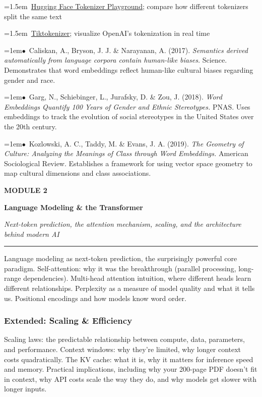 \documentclass[11pt, a4paper]{article}
\newcommand{\modulehead}[3]{%
  \vspace{0.5em}
  {\small\sffamily\bfseries\textcolor{accent}{MODULE #1}}\par\vspace{-0.3em}
  {\Large\sffamily\bfseries\textcolor{dark}{#2}}\par\vspace{-0.2em}
  {\small\textit{\textcolor{muted}{#3}}}\par
  \vspace{0.2em}\textcolor{bordercol}{\rule{\textwidth}{0.3pt}}\par
}
\newcommand{\seclabel}[1]{%
  \vspace{0.6em}{\normalsize\sffamily\bfseries\textcolor{accent}{#1}}\par\vspace{0.2em}
}
\newcommand{\refpaper}[1]{%
  \par\hangindent=1em\hangafter=1\noindent\textcolor{accent}{\small$\bullet$}~{\small #1}\par
}
\newcommand{\resource}[1]{%
  \par\hangindent=1.5em\hangafter=1\noindent\hspace{0.5em}{\small\textcolor{accent}{\guilsinglright}}~{\small #1}\par
}
\begin{document}
\resource{\href{https://huggingface.co/spaces/Xenova/the-tokenizer-playground}{Hugging Face Tokenizer Playground}; compare how different tokenizers split the same text}

\resource{\href{https://tiktokenizer.vercel.app}{Tiktokenizer}; visualize OpenAI's tokenization in real time}

\seclabel{Social Science Applications}

\refpaper{Caliskan, A., Bryson, J. J. \& Narayanan, A. (2017). \textit{Semantics derived automatically from language corpora contain human-like biases.} Science. Demonstrates that word embeddings reflect human-like cultural biases regarding gender and race.}

\refpaper{Garg, N., Schiebinger, L., Jurafsky, D. \& Zou, J. (2018). \textit{Word Embeddings Quantify 100 Years of Gender and Ethnic Stereotypes.} PNAS. Uses embeddings to track the evolution of social stereotypes in the United States over the 20th century.}

\refpaper{Kozlowski, A. C., Taddy, M. \& Evans, J. A. (2019). \textit{The Geometry of Culture: Analyzing the Meanings of Class through Word Embeddings.} American Sociological Review. Establishes a framework for using vector space geometry to map cultural dimensions and class associations.}

\vspace{1.5em}

\modulehead{2}{Language Modeling \& the Transformer}{Next-token prediction, the attention mechanism, scaling, and the architecture behind modern AI}

\seclabel{Core Concepts}

Language modeling as next-token prediction, the surprisingly powerful core paradigm. Self-attention: why it was the breakthrough (parallel processing, long-range dependencies). Multi-head attention intuition, where different heads learn different relationships. Perplexity as a measure of model quality and what it tells us. Positional encodings and how models know word order.

\subsubsection{Extended: Scaling \& Efficiency}

Scaling laws: the predictable relationship between compute, data, parameters, and performance. Context windows: why they're limited, why longer context costs quadratically. The KV cache: what it is, why it matters for inference speed and memory. Practical implications, including why your 200-page PDF doesn't fit in context, why API costs scale the way they do, and why models get slower with longer inputs.
\end{document}
